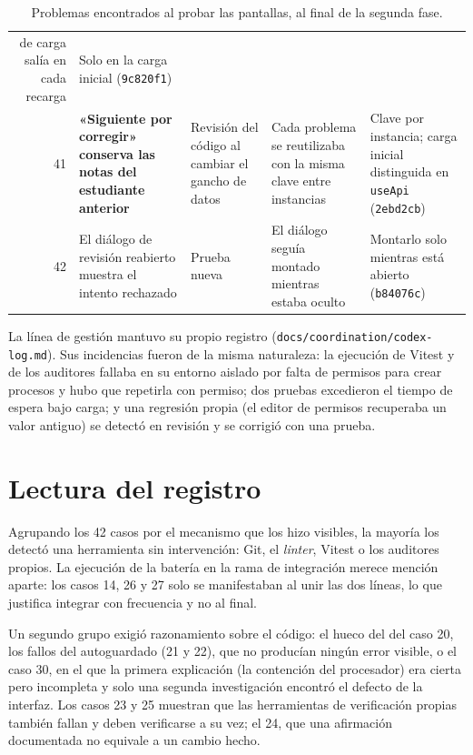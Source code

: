 \begin{table}[htbp]
\begin{tabular}{rp{}p{}p{}p{}}
      de carga salía en cada recarga & Solo en la carga inicial (\texttt{9c820f1}) \\
    41 & \textbf{«Siguiente por corregir» conserva las notas del estudiante anterior} &
      Revisión del código al cambiar el gancho de datos & Cada problema se reutilizaba
      con la misma clave entre instancias & Clave por instancia; carga inicial
      distinguida en \texttt{useApi} (\texttt{2ebd2cb}) \\
    42 & El diálogo de revisión reabierto muestra el intento rechazado & Prueba nueva &
      El diálogo seguía montado mientras estaba oculto & Montarlo solo mientras está
      abierto (\texttt{b84076c}) \\
    \bottomrule
  \end{tabular}
  \caption{Problemas encontrados al probar las pantallas, al final de la segunda
    fase.\label{TAB:IT-PHASE2B}}
\end{table}

La línea de gestión mantuvo su propio registro
(\texttt{docs/coordination/codex-log.md}). Sus incidencias fueron de la misma
naturaleza: la ejecución de Vitest y de los auditores fallaba en su entorno
aislado por falta de permisos para crear procesos y hubo que repetirla con
permiso; dos pruebas excedieron el tiempo de espera bajo carga; y una regresión
propia (el editor de permisos recuperaba un valor antiguo) se detectó en
revisión y se corrigió con una prueba.

\section*{Lectura del registro}

Agrupando los 42 casos por el mecanismo que los hizo visibles, la mayoría los
detectó una herramienta sin intervención: Git, el \textit{linter}, Vitest o los
auditores propios. La ejecución de la batería en la rama de integración merece
mención aparte: los casos 14, 26 y 27 solo se manifestaban al unir las dos
líneas, lo que justifica integrar con frecuencia y no al final.

Un segundo grupo exigió razonamiento sobre el código: el hueco del
 del caso 20, los fallos del autoguardado (21 y 22), que no
producían ningún error visible, o el caso 30, en el que la primera explicación
(la contención del procesador) era cierta pero incompleta y solo una segunda
investigación encontró el defecto de la interfaz. Los casos 23 y 25 muestran que
las herramientas de verificación propias también fallan y deben verificarse a su
vez; el 24, que una afirmación documentada no equivale a un cambio hecho.

